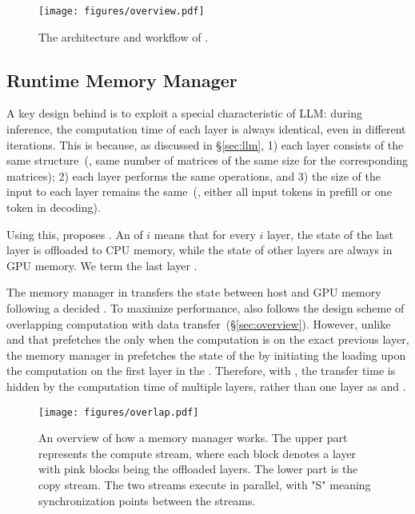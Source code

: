 \begin{figure}[t]
    \centering
    \texttt{[image: figures/overview.pdf]}
    \caption{The architecture and workflow of \sys.}
    \label{fig:overview}
\end{figure}



\subsection{Runtime Memory Manager}
\label{sec:runtimememorymanager}
%
%
A key design behind \interval is to exploit a special characteristic of LLM:  during inference, the computation time of each layer is always identical, even in different iterations.
%
This is because, as discussed in \S\ref{sec:llm}, 1) each layer consists of the 
same structure~(\ie, same number of matrices of the same size for the corresponding matrices); 
%
2) each layer performs the same operations, 
%
and 3) the size of the input to each layer remains the same~(\ie, either all 
input tokens in prefill or one token in decoding). 
%


%
Using this, \sys proposes \interval. 
%
An \interval of $i$ means that for every $i$ layer, the state of the last layer is offloaded to CPU memory, while the state of other layers are always 
in GPU memory. 
%
We term the last layer \oflayer. 
%

The memory manager in \sys transfers the state between host and GPU memory following a decided \interval. 
%
To maximize performance, \sys also follows the design scheme of overlapping computation with data transfer~(\S\ref{sec:overview}). 
%
However, unlike \deepspeed and \flexgen that prefetches the \oflayer only when 
the computation is on the exact previous layer, the memory manager in \sys prefetches the state of the \oflayer by initiating the loading upon the computation on the first layer 
in the \interval.  
%
Therefore, with \sys, 
the transfer time is hidden by the computation time of multiple layers, rather than one layer as \deepspeed and \flexgen. 


\begin{figure*}[t]
    \centering
    \texttt{[image: figures/overlap.pdf]}
    \caption{An overview of how a memory manager works. 
 The upper part represents the compute stream, where each block denotes 
 a layer with pink blocks being the offloaded layers. 
 The lower part is the copy stream. 
 The two streams execute in parallel, with "S" meaning synchronization points between the streams.}
    \label{fig:selectn}
\end{figure*}

